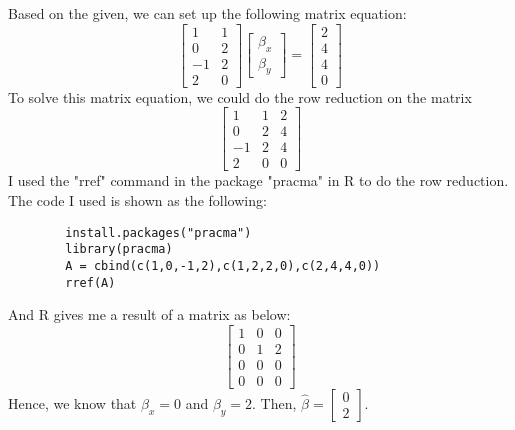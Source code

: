 \begin{answer}
    Based on the given, we can set up the following matrix equation:
    \begin{equation}
        \left[\begin{matrix}
            1 & 1\\
            0 & 2\\
            -1 & 2\\
            2 & 0
        \end{matrix}\right]
        \left[\begin{matrix}
            \beta_x\\
            \beta_y
        \end{matrix}\right]
        = 
        \left[\begin{matrix}
            2\\
            4\\
            4\\
            0
        \end{matrix}\right]
    \end{equation}
    To solve this matrix equation, we could do the row reduction on the matrix 
    \begin{equation}
        \left[\begin{matrix}
            1 & 1 & 2\\
            0 & 2 & 4\\
            -1 & 2 & 4\\
            2 & 0 & 0
        \end{matrix}\right]
    \end{equation}
    I used the "rref" command in the package "pracma" in R to do the row reduction. The code I used is shown as the following:
    \begin{verbatim}
        install.packages("pracma")
        library(pracma)
        A = cbind(c(1,0,-1,2),c(1,2,2,0),c(2,4,4,0))
        rref(A)
    \end{verbatim}
    And R gives me a result of a matrix as below:
    \begin{equation}
        \left[\begin{matrix}
            1 & 0 & 0\\
            0 & 1 & 2\\
            0 & 0 & 0\\
            0 & 0 & 0
        \end{matrix}\right]
    \end{equation}
    Hence, we know that $\beta_x = 0$ and $\beta_y = 2$. Then, $\hat{\beta} = \left[\begin{smallmatrix} 0 \\ 2 \end{smallmatrix}\right]$.
\end{answer}


